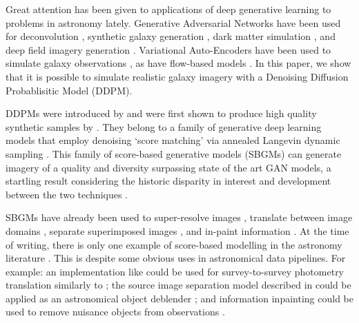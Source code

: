 \documentclass[fleqn,usenatbib]{mnras}
\begin{document}
Great attention has been given to applications of deep
generative learning to problems in astronomy lately. 
Generative Adversarial Networks
\citep[GAN;][]{cite_goodfellow2014} have been used for deconvolution
\citep{cite_schawinski2017}, synthetic galaxy generation
\citep{cite_ravanbakhsh2016,cite_fussell2019}, dark matter simulation
\citep{cite_mustafa2017,cite_tamosiunas2020}, and deep field imagery generation
\citep{cite_smith2019}. 
Variational Auto-Encoders
\citep[VAE;][]{cite_kingma2014} have been used to simulate galaxy observations
\citep{cite_ravanbakhsh2016,cite_spindler2021,cite_lanusse2021}, as have
flow-based models \citep{cite_rezende2015,cite_bretonniere2021}. In this paper,
we show that it is possible to simulate realistic galaxy imagery with a Denoising
Diffusion Probablisitic Model (DDPM).  

DDPMs were introduced by \citet{cite_sohldickstein2015} and were first shown to
produce high quality synthetic samples by \citet{cite_ho2020}.
They belong to a family of generative deep learning models that employ
denoising `score matching' via annealed Langevin dynamic sampling
\citep{cite_song2020,cite_ho2020,cite_ajm2020,cite_song2021}.  This family of
score-based generative models (SBGMs) can generate imagery of a quality and
diversity surpassing state of the art GAN models, a startling result
considering the historic disparity in interest and development between the two
techniques \citep{cite_song2021,cite_nichol2021,cite_dhariwal2021}.  

SBGMs have already been used to super-resolve images
\citep{cite_kadkhodaie2020,cite_saharia2021}, translate between image domains
\citep{cite_sasaki2021}, separate superimposed images \citep{cite_jayaram2020},
and in-paint information \citep{cite_kadkhodaie2020,cite_song2021}. At the time
of writing, there is only one example of score-based modelling in the
astronomy literature \citep{cite_remy2020}. This is despite some obvious uses
in astronomical data pipelines. For example: an implementation like
\citet{cite_sasaki2021} could be used for survey-to-survey photometry
translation similarly to \citet{cite_buncher2021}; the source image separation
model described in \citet{cite_jayaram2020} could be applied as an
astronomical object deblender \citep[for
example:][]{cite_stark2018,cite_reiman2019,cite_arcelin2021}; and information
inpainting could be used to remove nuisance objects from observations
\citep{cite_kadkhodaie2020,cite_song2021}.
\end{document}

